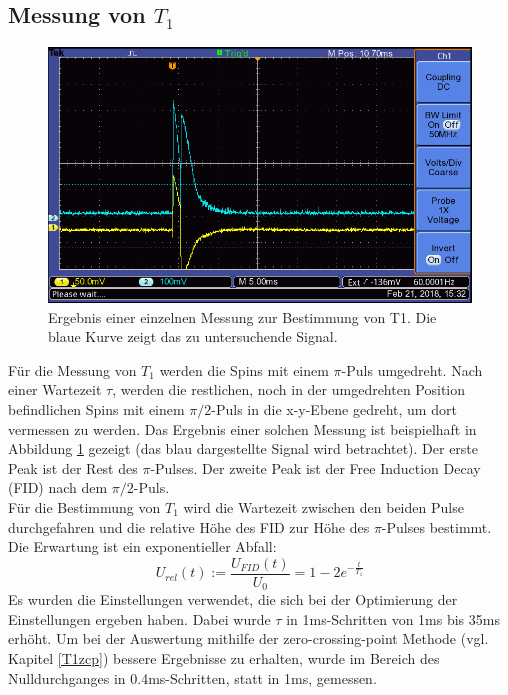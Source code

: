 \documentclass[12pt,a4paper]{article}
\begin{document}
\subsection{Messung von $T_1$}

\begin{figure}
\centering
\includegraphics[scale=0.8]{Bilder/F0003TEK.PNG}
\caption{Ergebnis einer einzelnen Messung zur Bestimmung von T1. Die blaue Kurve zeigt das zu untersuchende Signal.}
\label{fig:MessungT1_Beispiel}
\end{figure}

Für die Messung von $T_1$ werden die Spins mit einem $\pi$-Puls umgedreht. Nach einer Wartezeit $\tau$, werden die restlichen, noch in der umgedrehten Position befindlichen Spins mit einem $\pi /2$-Puls in die x-y-Ebene gedreht, um dort vermessen zu werden. Das Ergebnis einer solchen Messung ist beispielhaft in Abbildung \ref{fig:MessungT1_Beispiel} gezeigt (das blau dargestellte Signal wird betrachtet). Der erste Peak ist der Rest des $\pi$-Pulses. Der zweite Peak ist der Free Induction Decay (FID) nach dem $\pi /2$-Puls. \\
Für die Bestimmung von $T_1$ wird die Wartezeit zwischen den beiden Pulse durchgefahren und die relative Höhe des FID zur Höhe des $\pi$-Pulses bestimmt. Die Erwartung ist ein exponentieller Abfall:
\begin{equation}
\label{eq:T1_Exponentialfunktion}
U_{rel} (t) := \dfrac{U_{FID} (t)}{U_0} = 1 - 2 e^{-\frac{t}{T_1}}
\end{equation}
Es wurden die Einstellungen verwendet, die sich bei der Optimierung der Einstellungen ergeben haben. Dabei wurde $\tau$ in 1ms-Schritten von 1ms bis 35ms erhöht. Um bei der Auswertung mithilfe der zero-crossing-point Methode (vgl. Kapitel \ref{T1zcp}) bessere Ergebnisse zu erhalten, wurde im Bereich des Nulldurchganges in 0.4ms-Schritten, statt in 1ms, gemessen.
\end{document}
